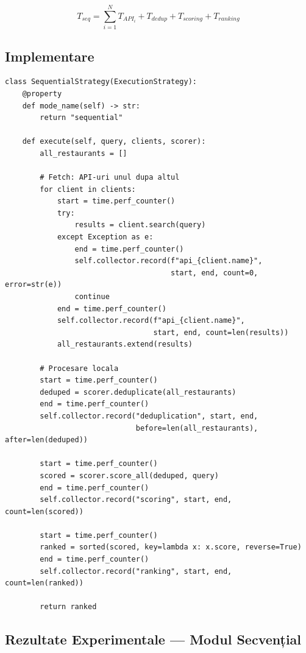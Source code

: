 \documentclass[12pt,a4paper]{article}
\begin{document}
\begin{formulabox}
\[
T_{seq} = \sum_{i=1}^{N} T_{API_i} + T_{dedup} + T_{scoring} + T_{ranking}
\]
\end{formulabox}

\subsection{Implementare}

\begin{lstlisting}[caption={SequentialStrategy (execution/sequential.py)}]
class SequentialStrategy(ExecutionStrategy):
    @property
    def mode_name(self) -> str:
        return "sequential"

    def execute(self, query, clients, scorer):
        all_restaurants = []

        # Fetch: API-uri unul dupa altul
        for client in clients:
            start = time.perf_counter()
            try:
                results = client.search(query)
            except Exception as e:
                end = time.perf_counter()
                self.collector.record(f"api_{client.name}",
                                      start, end, count=0, error=str(e))
                continue
            end = time.perf_counter()
            self.collector.record(f"api_{client.name}",
                                  start, end, count=len(results))
            all_restaurants.extend(results)

        # Procesare locala
        start = time.perf_counter()
        deduped = scorer.deduplicate(all_restaurants)
        end = time.perf_counter()
        self.collector.record("deduplication", start, end,
                              before=len(all_restaurants), after=len(deduped))

        start = time.perf_counter()
        scored = scorer.score_all(deduped, query)
        end = time.perf_counter()
        self.collector.record("scoring", start, end, count=len(scored))

        start = time.perf_counter()
        ranked = sorted(scored, key=lambda x: x.score, reverse=True)
        end = time.perf_counter()
        self.collector.record("ranking", start, end, count=len(ranked))

        return ranked
\end{lstlisting}

\subsection{Rezultate Experimentale --- Modul Secvențial}
\end{document}
